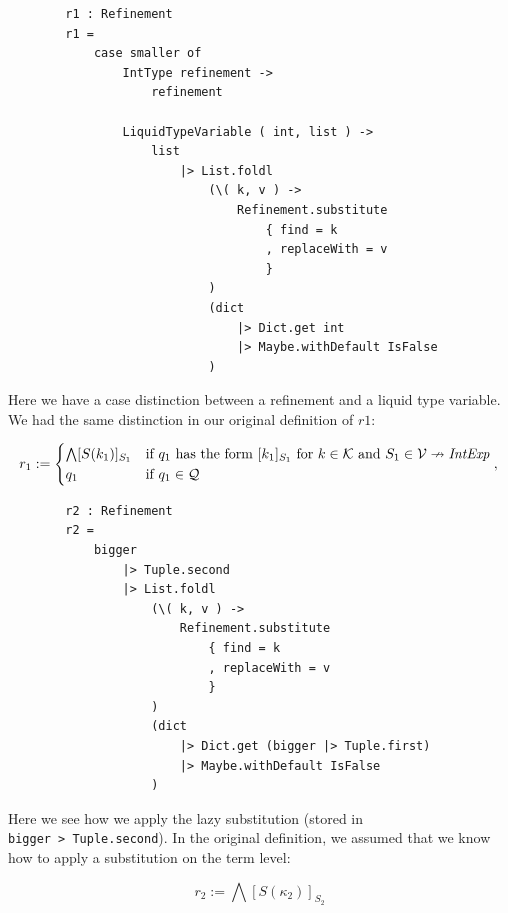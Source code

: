 \documentclass[]{scrbook}
\theoremstyle{definition}
\theoremstyle{definition}
\theoremstyle{definition}
\theoremstyle{remark}
\begin{document}
\text{\textemdash}

\begin{verbatim}
        r1 : Refinement
        r1 =
            case smaller of
                IntType refinement ->
                    refinement

                LiquidTypeVariable ( int, list ) ->
                    list
                        |> List.foldl
                            (\( k, v ) ->
                                Refinement.substitute
                                    { find = k
                                    , replaceWith = v
                                    }
                            )
                            (dict
                                |> Dict.get int
                                |> Maybe.withDefault IsFalse
                            )
\end{verbatim}

Here we have a case distinction between a refinement and a liquid type
variable. We had the same distinction in our original definition of
\(r1\):

\[
r_1 := \begin{cases}\bigwedge [S(k_1)]_{S_1}&\text{if } q_1 \text{ has the form } [k_1]_{S_1} \text{ for } k\in\mathcal{K}\text{ and } S_1\in\mathcal{V}\nrightarrow\mathit{IntExp}\\
q_1& \text{if }q_1\in\mathcal{Q}
\end{cases},\\
\]

\text{\textemdash}

\begin{verbatim}
        r2 : Refinement
        r2 =
            bigger
                |> Tuple.second
                |> List.foldl
                    (\( k, v ) ->
                        Refinement.substitute
                            { find = k
                            , replaceWith = v
                            }
                    )
                    (dict
                        |> Dict.get (bigger |> Tuple.first)
                        |> Maybe.withDefault IsFalse
                    )
\end{verbatim}

Here we see how we apply the lazy substitution (stored in
\texttt{bigger\ \textbar{}\textgreater{}\ Tuple.second}). In the
original definition, we assumed that we know how to apply a substitution
on the term level:

\[
r_2 := \bigwedge [S(\kappa_2)]_{S_2}
\]
\end{document}
